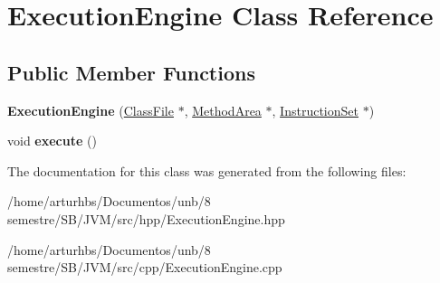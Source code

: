 \hypertarget{classExecutionEngine}{}\section{Execution\+Engine Class Reference}
\label{classExecutionEngine}
\subsection*{Public Member Functions}
\begin{DoxyCompactItemize}
\item 
{\bfseries Execution\+Engine} (\hyperlink{classClassFile}{Class\+File} $\ast$, \hyperlink{classMethodArea}{Method\+Area} $\ast$, \hyperlink{classInstructionSet}{Instruction\+Set} $\ast$)\hypertarget{classExecutionEngine_a001eeecb7503b7c065a1856621331d48}{}\label{classExecutionEngine_a001eeecb7503b7c065a1856621331d48}

\item 
void {\bfseries execute} ()\hypertarget{classExecutionEngine_ae94b5187f2d6b92b1ca162b4a040235f}{}\label{classExecutionEngine_ae94b5187f2d6b92b1ca162b4a040235f}

\end{DoxyCompactItemize}


The documentation for this class was generated from the following files\+:\begin{DoxyCompactItemize}
\item 
/home/arturhbs/\+Documentos/unb/8 semestre/\+S\+B/\+J\+V\+M/src/hpp/Execution\+Engine.\+hpp\item 
/home/arturhbs/\+Documentos/unb/8 semestre/\+S\+B/\+J\+V\+M/src/cpp/Execution\+Engine.\+cpp\end{DoxyCompactItemize}
